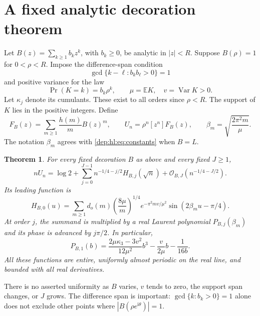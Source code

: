 \documentclass[11pt]{article}
\newtheorem{theorem}{Theorem}[section]
\theoremstyle{definition}\newtheorem{definition}[theorem]{Definition}
\theoremstyle{remark}\newtheorem{remark}[theorem]{Remark}
\newcommand{\OO}{\mathcal O}
\newcommand{\EE}{\mathbb E}
\newcommand{\Var}{\operatorname{Var}}
\newcommand{\ii}{\mathrm i}
\begin{document}
\section{A fixed analytic decoration theorem}\label{dep:hl:sec:general}
Let $B(z)=\sum_{k\ge1}b_kz^k$, with $b_k\ge0$, be analytic in $|z|<R$.
Suppose $B(\rho)=1$ for $0<\rho<R$. Impose the difference-span condition
\begin{equation}\label{dep:hl:eq:span}
 \gcd\{k-\ell:b_kb_\ell>0\}=1
\end{equation}
and positive variance for the law
\begin{equation}\label{dep:hl:eq:law}
 \Pr(K=k)=b_k\rho^k,\qquad
 \mu=\EE K,\quad v=\Var K>0.
\end{equation}
Let $\kappa_j$ denote its cumulants. These exist to all orders since
$\rho<R$. The support of $K$ lies in the positive integers. Define
\begin{equation}\label{dep:hl:eq:generaldef}
 F_B(z)=\sum_{m\ge1}\frac{h(m)}m B(z)^m,
 \qquad U_n=\rho^n[z^n]F_B(z),
 \qquad \beta_m=\sqrt{\frac{2\pi^2m}{\mu}}.
\end{equation}
The notation $\beta_m$ agrees with \eqref{dep:hl:eq:constants} when $B=L$.
\begin{theorem}\label{dep:hl:thm:general}
For every fixed decoration $B$ as above and every fixed $J\ge1$,
\begin{equation}\label{dep:hl:eq:general}
 nU_n=\log 2+\sum_{j=0}^{J-1}n^{-1/4-j/2}H_{B,j}(\sqrt n)
                    +\OO_{B,J}(n^{-1/4-J/2}).
\end{equation}
Its leading function is
\begin{equation}\label{dep:hl:eq:generalH}
 H_{B,0}(u)=\sum_{m\ge1}d_o(m)\left(\frac{8\mu}{m}\right)^{1/4}
 e^{-\pi^2mv/\mu^2}\sin(2\beta_mu-\pi/4).
\end{equation}
At order $j$, the summand is multiplied by a real Laurent polynomial
$P_{B,j}(\beta_m)$ and its phase is advanced by $j\pi/2$.
In particular,
\begin{equation}\label{dep:hl:eq:generalP1}
 P_{B,1}(b)=\frac{2\mu\kappa_3-3v^2}{12\mu^2}b^3
              -\frac{v}{2\mu}b-\frac1{16b}.
\end{equation}
All these functions are entire, uniformly almost periodic on the real
line, and bounded with all real derivatives.
\end{theorem}
There is no asserted uniformity as $B$ varies, $v$ tends to zero, the
support span changes, or $J$ grows. The difference span is important:
$\gcd\{k:b_k>0\}=1$ alone does not exclude other points where
$|B(\rho e^{\ii\theta})|=1$.
\end{document}
